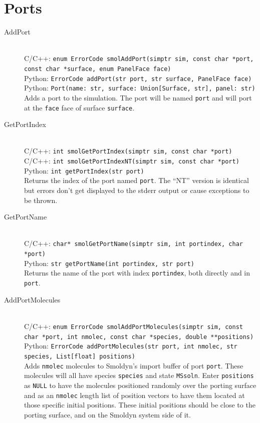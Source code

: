 \documentclass {scrbook}
\newcommand {\ttt} {\texttt}
\begin{document}
\section{Ports}

\begin{description}

\item[AddPort]
\hfill \\
C/C++: \ttt{enum ErrorCode smolAddPort(simptr sim, const char *port, const char *surface, enum PanelFace face)}\\
Python: \ttt{ErrorCode addPort(str port, str surface, PanelFace face)}\\
Python: \ttt{Port(name: str, surface: Union[Surface, str], panel: str)}\\
Adds a port to the simulation. The port will be named \ttt{port} and will port at the \ttt{face} face of surface \ttt{surface}.

\item[GetPortIndex]
\hfill \\
C/C++: \ttt{int smolGetPortIndex(simptr sim, const char *port)}\\
C/C++: \ttt{int smolGetPortIndexNT(simptr sim, const char *port)}\\
Python: \ttt{int getPortIndex(str port)}\\
Returns the index of the port named \ttt{port}. The ``NT'' version is identical but errors don't get displayed to the stderr output or cause exceptions to be thrown.

\item[GetPortName]
\hfill \\
C/C++: \ttt{char* smolGetPortName(simptr sim, int portindex, char *port)}\\
Python: \ttt{str getPortName(int portindex, str port)}\\
Returns the name of the port with index \ttt{portindex}, both directly and in \ttt{port}.

\item[AddPortMolecules]
\hfill \\
C/C++: \ttt{enum ErrorCode smolAddPortMolecules(simptr sim, const char *port, int nmolec, const char *species, double **positions)}\\
Python: \ttt{ErrorCode addPortMolecules(str port, int nmolec, str species, List[float] positions)}\\
Adds \ttt{nmolec} molecules to Smoldyn's import buffer of port \ttt{port}. These molecules will all have species \ttt{species} and state \ttt{MSsoln}. Enter \ttt{positions} as \ttt{NULL} to have the molecules positioned randomly over the porting surface and as an \ttt{nmolec} length list of position vectors to have them located at those specific initial positions. These initial positions should be close to the porting surface, and on the Smoldyn system side of it.


\end{description}
\end{document}
